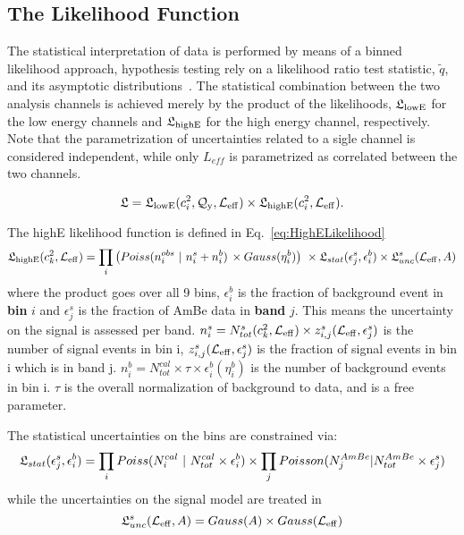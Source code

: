 
\subsection{The Likelihood Function}
\label{sec:LikelihoodFunction}
The statistical interpretation of data is performed by means of a binned likelihood approach, hypothesis testing rely on a likelihood ratio test statistic, $\tilde{q}$, 
and its asymptotic distributions~\cite{asympt}. The statistical combination between the two analysis channels is achieved merely by the product of the likelihoods,
$\mathfrak{L}_{\mathrm{lowE}}$ for the low energy channels and $\mathfrak{L}_{\mathrm{highE}}$ for the high energy channel, respectively. 
Note that the parametrization of uncertainties related to a sigle channel is considered independent, while only $L_{eff}$ is parametrized as correlated
between the two channels.

\begin{equation}
\label{eq:FullLikelihood}
\mathfrak{L} = \mathfrak{L}_{\mathrm{lowE}}(c_i^2,\mathcal{Q}_{\mathrm{y}},\mathcal{L}_{\mathrm{eff}}) \times \mathfrak{L}_{\mathrm{highE}}(c_i^2,\mathcal{L}_{\mathrm{eff}})  .
\end{equation}

The highE likelihood function is defined in Eq.~\ref{eq:HighELikelihood}
\begin{equation}
\label{eq:HighELikelihood}
\mathfrak{L}_{\mathrm{highE}}(c_k^2,\mathcal{L}_{\mathrm{eff}}) = \prod_{i} \big( Poiss(n^{obs}_{i}~|~n^{s}_{i} + n^{b}_{i}) \, \times Gauss(\eta^{b}_{i}) \big) ~ \times \mathfrak{L}_{stat}(\epsilon^{s}_{j},\epsilon^{b}_{i}) \times \mathfrak{L}^s_{unc}(\mathcal{L}_{\mathrm{eff}}, A)
\end{equation}
where the product goes over all 9 bins, $\epsilon^{b}_{i}$ is the fraction of background event in \textbf{bin} $i$ and  $\epsilon^{s}_{j}$ is the fraction of AmBe data in \textbf{band} $j$. This means the uncertainty on the signal is assessed per band. $n_i^s = N_{tot}^s(c_k^2,\mathcal{L}_{\mathrm{eff}}) \times z_{i,j}^s(\mathcal{L}_{\mathrm{eff}} ,\epsilon^{s}_{j})$ is the number of signal events in bin i, $z_{i,j}^s(\mathcal{L}_{\mathrm{eff}}, \epsilon^{s}_{j})$ is the fraction of signal events in bin i which is in band j. $n_i^b = N_{tot}^{cal} \times \tau \times \epsilon^{b}_{i}(\eta^{b}_{i})$ is the number of background events in bin i. $\tau$ is the overall normalization of background to data, and is a free parameter.  

The statistical uncertainties on the bins are constrained via:
\begin{equation}
\label{eq:LstsatHighE}
\mathfrak{L}_{stat}(\epsilon^{s}_{j},\epsilon^{b}_{i}) = \prod_{i}Poiss(N_i^{cal}~|~N_{tot}^{cal} \times \epsilon^{b}_{i}) \times \prod_j Poisson(N_j^{AmBe} | N_{tot}^{AmBe} \times \epsilon^{s}_{j})
\end{equation}
while the uncertainties on the signal model are treated in 
\begin{equation}
\mathfrak{L}^s_{unc}(\mathcal{L}_{\mathrm{eff}}, A) = Gauss(A) \times Gauss(\mathcal{L}_{\mathrm{eff}})
\end{equation}

